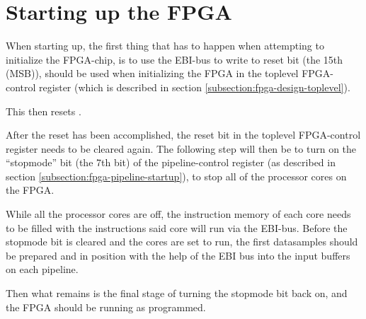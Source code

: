 \chapter{Starting up the FPGA}\label{appendix:starting-fpga}


When starting up, the first thing that has to happen when attempting to
initialize the FPGA-chip, is to use the EBI-bus to write to reset bit (the 15th
(MSB)), should be used when initializing the FPGA in the toplevel
FPGA-control register (which is described in section
\ref{subsection:fpga-design-toplevel}).

This then resets .

After the reset has been accomplished, the reset bit in the toplevel
FPGA-control register needs to be cleared again. The following step will then be
to turn on the ``stopmode'' bit (the 7th bit) of the pipeline-control
register (as described in section \ref{subsection:fpga-pipeline-startup}),
to stop all of the processor cores on the FPGA.

While all the processor cores are off, the instruction memory of each core needs
to be filled with the instructions said core will run via the EBI-bus. Before
the stopmode bit is cleared and the cores are set to run, the first datasamples
should be prepared and in position with the help of the EBI bus into the input
buffers on each pipeline.

Then what remains is the final stage of turning the stopmode bit back on, and
the FPGA should be running as programmed.

